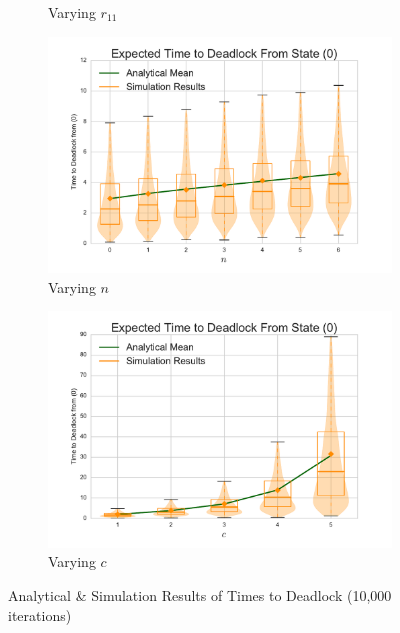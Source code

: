 \documentclass{article}
\begin{document}
\begin{figure}[!htbp]
\begin{subfigure}[b]{0.5\textwidth}
    \caption{Varying $r_{11}$}
    \label{fig:1Nms_r11}
  \end{subfigure}
  \begin{subfigure}[b]{0.5\textwidth}
    \includegraphics[width=\textwidth]{images/varyn_1Nms}
    \caption{Varying $n$}
    \label{fig:1Nms_n}
  \end{subfigure}
  \begin{center}
  \begin{subfigure}[b]{0.5\textwidth}
    \includegraphics[width=\textwidth]{images/varyc_1Nms}
    \caption{Varying $c$}
    \label{fig:1Nms_c}
  \end{subfigure}
  \end{center}
  \caption{Analytical \& Simulation Results of Times to Deadlock (10,000 iterations)}
  \label{fig:timestodeadlock1nodemultiserver}
\end{figure}
\end{document}
